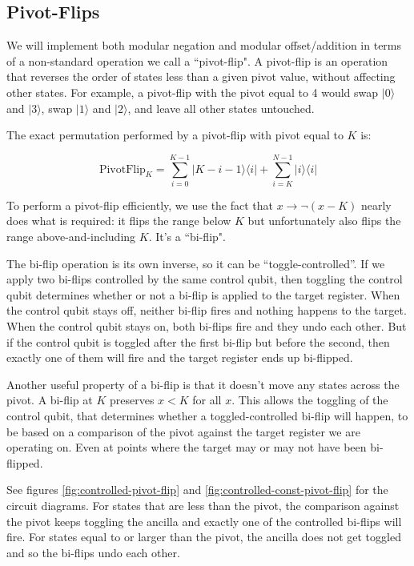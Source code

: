 \documentclass[twocolumn]{article}
\begin{document}
\subsection{Pivot-Flips} \label{sec:pivot-flips}

We will implement both modular negation and modular offset/addition in terms of a non-standard operation we call a ``pivot-flip".
A pivot-flip is an operation that reverses the order of states less than a given pivot value, without affecting other states.
For example, a pivot-flip with the pivot equal to 4 would swap $|0\rangle$ and $|3\rangle$, swap $|1\rangle$ and $|2\rangle$, and leave all other states untouched.

The exact permutation performed by a pivot-flip with pivot equal to $K$ is:

$$\text{PivotFlip}_K = \sum_{i=0}^{K-1} |K-i-1\rangle \langle i| + \sum_{i=K}^{N-1} |i\rangle \langle i|$$

To perform a pivot-flip efficiently, we use the fact that $x \rightarrow \lnot(x - K)$ nearly does what is required: it flips the range below $K$ but unfortunately also flips the range above-and-including $K$.
It's a ``bi-flip".

The bi-flip operation is its own inverse, so it can be ``toggle-controlled''.
If we apply two bi-flips controlled by the same control qubit, then toggling the control qubit determines whether or not a bi-flip is applied to the target register.
When the control qubit stays off, neither bi-flip fires and nothing happens to the target.
When the control qubit stays on, both bi-flips fire and they undo each other.
But if the control qubit is toggled after the first bi-flip but before the second, then exactly one of them will fire and the target register ends up bi-flipped.

Another useful property of a bi-flip is that it doesn't move any states across the pivot.
A bi-flip at $K$ preserves $x<K$ for all $x$.
This allows the toggling of the control qubit, that determines whether a toggled-controlled bi-flip will happen, to be based on a comparison of the pivot against the target register we are operating on.
Even at points where the target may or may not have been bi-flipped.

See figures \ref{fig:controlled-pivot-flip} and \ref{fig:controlled-const-pivot-flip} for the circuit diagrams.
For states that are less than the pivot, the comparison against the pivot keeps toggling the ancilla and exactly one of the controlled bi-flips will fire.
For states equal to or larger than the pivot, the ancilla does not get toggled and so the bi-flips undo each other.
\end{document}
